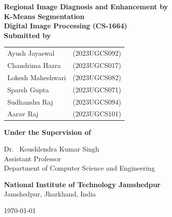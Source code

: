 \begin{titlepage}
    \centering

    {\LARGE \textbf{Regional Image Diagnosis and Enhancement by \\[0.2cm] K-Means Segmentation}}\\[1.5cm]

    {\large \textbf{Digital Image Processing (CS-1664)}}\\[1.5cm]

        {\Large \textbf{Submitted by}}
        
        \vspace{0.5cm}
        
        \begin{tabular}{ll}
            {\large Ayush Jayaswal} & {\large (2023UGCS092)}\\[0.3cm]
            {\large Chandrima Hazra} & {\large (2023UGCS017)}\\[0.3cm]
            {\large Lokesh Maheshwari} & {\large (2023UGCS082)}\\[0.3cm]
            {\large Sparsh Gupta} & {\large (2023UGCS071)} \\[0.3cm]
            {\large Sudhanshu Raj} & {\large (2023UGCS094)} \\[0.3cm]
            {\large Aarav Raj} & {\large (2023UGCS101)}
        \end{tabular}
        
        \vfill
        
        {\Large \textbf{Under the Supervision of}}
        
        \vspace{0.5cm}
        
        {\large Dr. \ Koushlendra Kumar Singh}\\[0.2cm]
        {\normalsize Assistant Professor}\\
        {\normalsize Department of Computer Science and Engineering}
        
        \vfill
        
        
        \vspace{0.5cm}
        
        {\Large \textbf{National Institute of Technology Jamshedpur}}\\[0.3cm]
        {\normalsize Jamshedpur, Jharkhand, India}
        
        \vspace{1cm}
        
        {\large \today}
        
        \vspace{1cm}
\end{titlepage}
